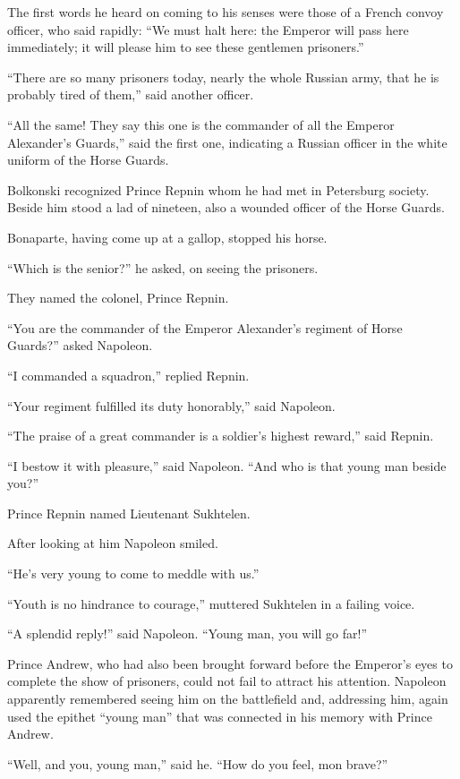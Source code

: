 The first words he heard on coming to his senses were those of a
French convoy officer, who said rapidly: ``We must halt here: the
Emperor will pass here immediately; it will please him to see
these gentlemen prisoners.''

``There are so many prisoners today, nearly the whole Russian
army, that he is probably tired of them,'' said another officer.

``All the same! They say this one is the commander of all the
Emperor Alexander's Guards,'' said the first one, indicating a
Russian officer in the white uniform of the Horse Guards.

Bolkonski recognized Prince Repnin whom he had met in Petersburg
society. Beside him stood a lad of nineteen, also a wounded
officer of the Horse Guards.

Bonaparte, having come up at a gallop, stopped his horse.

``Which is the senior?'' he asked, on seeing the prisoners.

They named the colonel, Prince Repnin.

``You are the commander of the Emperor Alexander's regiment of
Horse Guards?'' asked Napoleon.

``I commanded a squadron,'' replied Repnin.

``Your regiment fulfilled its duty honorably,'' said Napoleon.

``The praise of a great commander is a soldier's highest
reward,'' said Repnin.

``I bestow it with pleasure,'' said Napoleon. ``And who is that
young man beside you?''

Prince Repnin named Lieutenant Sukhtelen.

After looking at him Napoleon smiled.

``He's very young to come to meddle with us.''

``Youth is no hindrance to courage,'' muttered Sukhtelen in a
failing voice.

``A splendid reply!'' said Napoleon. ``Young man, you will go
far!''

Prince Andrew, who had also been brought forward before the
Emperor's eyes to complete the show of prisoners, could not fail
to attract his attention. Napoleon apparently remembered seeing
him on the battlefield and, addressing him, again used the
epithet ``young man'' that was connected in his memory with
Prince Andrew.

``Well, and you, young man,'' said he. ``How do you feel, mon
brave?''

